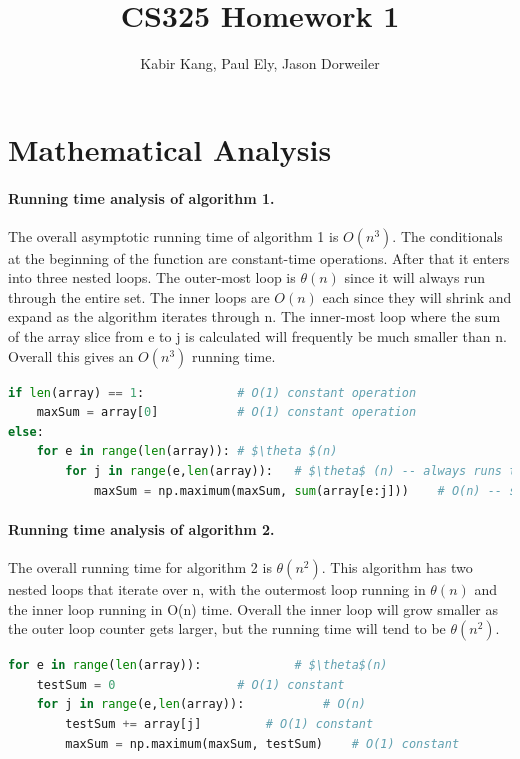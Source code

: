 \documentclass[a4paper,12pt]{article}
\title{CS325 Homework 1}
\author{Kabir Kang, Paul Ely, Jason Dorweiler}
\begin{document}
\maketitle

\section{Mathematical Analysis}


\paragraph{Running time analysis of algorithm 1.}  The overall asymptotic running time of algorithm 1 is $O(n^3)$. The conditionals at the beginning of the function are constant-time operations. After that it enters into three nested loops. The outer-most loop is $\theta(n)$ since it will always run through the entire set. The inner loops are $O(n)$ each since they will shrink and expand as the algorithm iterates through n. The inner-most loop where the sum of the array slice from e to j is calculated will frequently be much smaller than n. Overall this gives an $O(n^3)$ running time. 

  \begin{lstlisting}[language=python,caption={pseudo code for $n^3$ algorithm},mathescape]
if len(array) == 1:				# O(1) constant operation
	maxSum = array[0]			# O(1) constant operation
else:
	for e in range(len(array)):	# $\theta $(n)
		for j in range(e,len(array)):	# $\theta$ (n) -- always runs through all elements
			maxSum = np.maximum(maxSum, sum(array[e:j]))	# O(n) -- shrinks
  \end{lstlisting}

\paragraph{Running time analysis of algorithm 2.} The overall running time for algorithm 2 is $\theta(n^2)$. This algorithm has two nested loops that iterate over n, with the outermost loop running in $\theta(n)$ and the inner loop running in O(n) time. Overall the inner loop will grow smaller as the outer loop counter gets larger, but the running time will tend to be $\theta(n^2)$.
  \begin{lstlisting}[language=python,caption={pseudo code for $n^2$ algorithm},mathescape]
for e in range(len(array)):				# $\theta$(n)
	testSum = 0					# O(1) constant
	for j in range(e,len(array)):			# O(n)
		testSum += array[j]			# O(1) constant
		maxSum = np.maximum(maxSum, testSum)	# O(1) constant
  \end{lstlisting}
\end{document}
